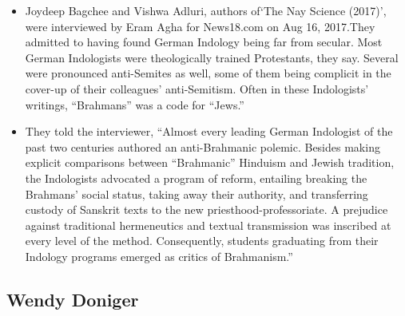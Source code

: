 \begin{itemize}
\item Joydeep Bagchee and Vishwa Adluri, authors of‘The Nay Science (2017)’, were interviewed by Eram Agha for News18.com on Aug 16, 2017.They admitted to having found German Indology being far from secular. Most German Indologists were theologically trained Protestants, they say. Several were pronounced anti-Semites as well, some of them being complicit in the cover-up of their colleagues’ anti-Semitism. Often in these Indologists’ writings, “Brahmans” was a code for “Jews.”

 \item They told the interviewer, “Almost every leading German Indologist of the past two centuries authored an anti-Brahmanic polemic. Besides making explicit comparisons between “Brahmanic” Hinduism and Jewish tradition, the Indologists advocated a program of reform, entailing breaking the Brahmans’ social status, taking away their authority, and transferring custody of Sanskrit texts to the new priesthood-professoriate. A prejudice against traditional hermeneutics and textual transmission was inscribed at every level of the method. Consequently, students graduating from their Indology programs emerged as critics of Brahmanism.”

\end{itemize}


\subsection*{Wendy Doniger}

